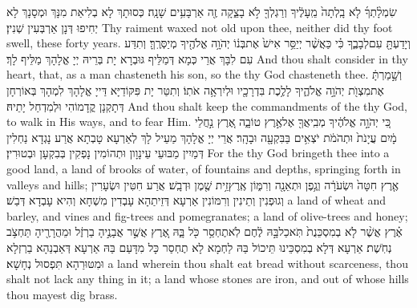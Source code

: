 {שִׂמְלָ֨תְךָ֜ לֹ֤א בָֽלְתָה֙ מֵֽעָלֶ֔יךָ וְרַגְלְךָ֖ לֹ֣א בָצֵ֑קָה זֶ֖ה אַרְבָּעִ֥ים שָׁנָֽה׃}
{כְּסוּתָךְ לָא בְלִיאַת מִנָּךְ וּמְסָנָךְ לָא יְחִיפוּ דְּנָן אַרְבְּעִין שְׁנִין׃}
{Thy raiment waxed not old upon thee, neither did thy foot swell, these forty years.}{}
{וְיָדַעְתָּ֖ עִם\maqqaf לְבָבֶ֑ךָ כִּ֗י כַּאֲשֶׁ֨ר יְיַסֵּ֥ר אִישׁ֙ אֶת\maqqaf בְּנ֔וֹ יְהֹוָ֥ה אֱלֹהֶ֖יךָ מְיַסְּרֶֽךָּ׃}
{וְתִדַּע עִם לִבָּךְ אֲרֵי כְּמָא דְּמַלֵּיף גּוּבְרָא יָת בְּרֵיהּ יְיָ אֱלָהָךְ מַלֵּיף לָךְ׃}
{And thou shalt consider in thy heart, that, as a man chasteneth his son, so the \lord\space thy God chasteneth thee.}{}
{וְשָׁ֣מַרְתָּ֔ אֶת\maqqaf מִצְוֺ֖ת יְהֹוָ֣ה אֱלֹהֶ֑יךָ לָלֶ֥כֶת בִּדְרָכָ֖יו וּלְיִרְאָ֥ה אֹתֽוֹ׃}
{וְתִטַּר יָת פִּקּוֹדַיָּא דַּייָ אֱלָהָךְ לִמְהָךְ בְּאוֹרְחָן דְּתָקְנָן קֳדָמוֹהִי וּלְמִדְחַל יָתֵיהּ׃}
{And thou shalt keep the commandments of the \lord\space thy God, to walk in His ways, and to fear Him.}{}
{כִּ֚י יְהֹוָ֣ה אֱלֹהֶ֔יךָ מְבִֽיאֲךָ֖ אֶל\maqqaf אֶ֣רֶץ טוֹבָ֑ה אֶ֚רֶץ נַ֣חֲלֵי מָ֔יִם עֲיָנֹת֙ וּתְהֹמֹ֔ת יֹצְאִ֥ים בַּבִּקְעָ֖ה וּבָהָֽר׃}
{אֲרֵי יְיָ אֱלָהָךְ מַעֵיל לָךְ לְאַרְעָא טָבְתָא אֲרַע נָגְדָא נַחְלִין דְּמַיִין מַבּוּעֵי עֵינָוָון וּתְהוֹמִין נָפְקִין בְּבִקְעָן וּבְטוּרִין׃}
{For the \lord\space thy God bringeth thee into a good land, a land of brooks of water, of fountains and depths, springing forth in valleys and hills;}{}
{אֶ֤רֶץ חִטָּה֙ וּשְׂעֹרָ֔ה וְגֶ֥פֶן וּתְאֵנָ֖ה וְרִמּ֑וֹן אֶֽרֶץ\maqqaf זֵ֥ית שֶׁ֖מֶן וּדְבָֽשׁ׃}
{אֲרַע חִטִּין וּשְׂעָרִין וְגוּפְנִין וְתֵינִין וְרִמּוֹנִין אַרְעָא דְּזֵיתַהָא עָבְדִין מִשְׁחָא וְהִיא עָבְדָא דְּבַשׁ׃}
{a land of wheat and barley, and vines and fig-trees and pomegranates; a land of olive-trees and honey;}{}
{אֶ֗רֶץ אֲשֶׁ֨ר לֹ֤א בְמִסְכֵּנֻת֙ תֹּֽאכַל\maqqaf בָּ֣הּ לֶ֔חֶם לֹֽא\maqqaf תֶחְסַ֥ר כֹּ֖ל בָּ֑הּ אֶ֚רֶץ אֲשֶׁ֣ר אֲבָנֶ֣יהָ בַרְזֶ֔ל וּמֵהֲרָרֶ֖יהָ תַּחְצֹ֥ב נְחֹֽשֶׁת׃}
{אַרְעָא דְּלָא בְמִסְכֵּינוּ תֵּיכוֹל בַּהּ לַחְמָא לָא תֶחְסַר כָּל מִדָּעַם בַּהּ אַרְעָא דְּאַבְנַהָא בַרְזְלָא וּמִטּוּרַהָא תִּפְסוּל נְחָשָׁא׃}
{a land wherein thou shalt eat bread without scarceness, thou shalt not lack any thing in it; a land whose stones are iron, and out of whose hills thou mayest dig brass.}{}

